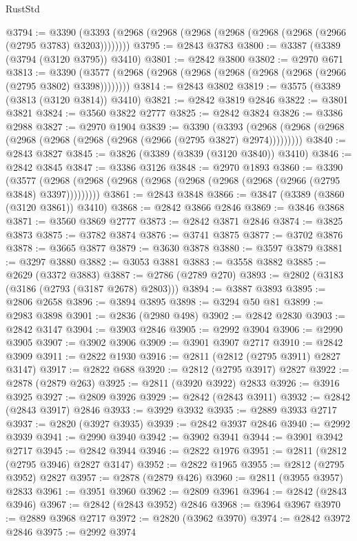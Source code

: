 \begin{lexlean}{RustStd}
\begin{coremodule}
@3794 := @3390 (@3393 (@2968 (@2968 (@2968 (@2968 (@2968 (@2968 (@2966 (@2795 @3783) @3203))))))))
@3795 := @2843 @3783
@3800 := @3387 (@3389 (@3794 (@3120 @3795)) @3410)
@3801 := @2842 @3800
@3802 := @2970 @671
@3813 := @3390 (@3577 (@2968 (@2968 (@2968 (@2968 (@2968 (@2968 (@2966 (@2795 @3802) @3398))))))))
@3814 := @2843 @3802
@3819 := @3575 (@3389 (@3813 (@3120 @3814)) @3410)
@3821 := @2842 @3819 @2846
@3822 := @3801 @3821
@3824 := @3560 @3822 @2777
@3825 := @2842 @3824
@3826 := @3386 @2988
@3827 := @2970 @1904
@3839 := @3390
    (@3393 (@2968 (@2968 (@2968 (@2968 (@2968 (@2968 (@2968 (@2966 (@2795 @3827) @2974)))))))))
@3840 := @2843 @3827
@3845 := @3826 (@3389 (@3839 (@3120 @3840)) @3410)
@3846 := @2842 @3845
@3847 := @3386 @3126
@3848 := @2970 @1893
@3860 := @3390
    (@3577 (@2968 (@2968 (@2968 (@2968 (@2968 (@2968 (@2968 (@2966 (@2795 @3848) @3397)))))))))
@3861 := @2843 @3848
@3866 := @3847 (@3389 (@3860 (@3120 @3861)) @3410)
@3868 := @2842 @3866 @2846
@3869 := @3846 @3868
@3871 := @3560 @3869 @2777
@3873 := @2842 @3871 @2846
@3874 := @3825 @3873
@3875 := @3782 @3874
@3876 := @3741 @3875
@3877 := @3702 @3876
@3878 := @3665 @3877
@3879 := @3630 @3878
@3880 := @3597 @3879
@3881 := @3297 @3880
@3882 := @3053 @3881
@3883 := @3558 @3882
@3885 := @2629 (@3372 @3883)
@3887 := @2786 (@2789 @270)
@3893 := @2802 (@3183 (@3186 (@2793 (@3187 @2678) @2803)))
@3894 := @3887 @3893
@3895 := @2806 @2658
@3896 := @3894 @3895
@3898 := @3294 @50 @81
@3899 := @2983 @3898
@3901 := @2836 (@2980 @498)
@3902 := @2842 @2830
@3903 := @2842 @3147
@3904 := @3903 @2846
@3905 := @2992 @3904
@3906 := @2990 @3905
@3907 := @3902 @3906
@3909 := @3901 @3907 @2717
@3910 := @2842 @3909
@3911 := @2822 @1930
@3916 := @2811 (@2812 (@2795 @3911) @2827 @3147)
@3917 := @2822 @688
@3920 := @2812 (@2795 @3917) @2827
@3922 := @2878 (@2879 @263)
@3925 := @2811 (@3920 @3922) @2833
@3926 := @3916 @3925
@3927 := @2809 @3926
@3929 := @2842 (@2843 @3911)
@3932 := @2842 (@2843 @3917) @2846
@3933 := @3929 @3932
@3935 := @2889 @3933 @2717
@3937 := @2820 (@3927 @3935)
@3939 := @2842 @3937 @2846
@3940 := @2992 @3939
@3941 := @2990 @3940
@3942 := @3902 @3941
@3944 := @3901 @3942 @2717
@3945 := @2842 @3944
@3946 := @2822 @1976
@3951 := @2811 (@2812 (@2795 @3946) @2827 @3147)
@3952 := @2822 @1965
@3955 := @2812 (@2795 @3952) @2827
@3957 := @2878 (@2879 @426)
@3960 := @2811 (@3955 @3957) @2833
@3961 := @3951 @3960
@3962 := @2809 @3961
@3964 := @2842 (@2843 @3946)
@3967 := @2842 (@2843 @3952) @2846
@3968 := @3964 @3967
@3970 := @2889 @3968 @2717
@3972 := @2820 (@3962 @3970)
@3974 := @2842 @3972 @2846
@3975 := @2992 @3974

\end{coremodule}
\end{lexlean}
